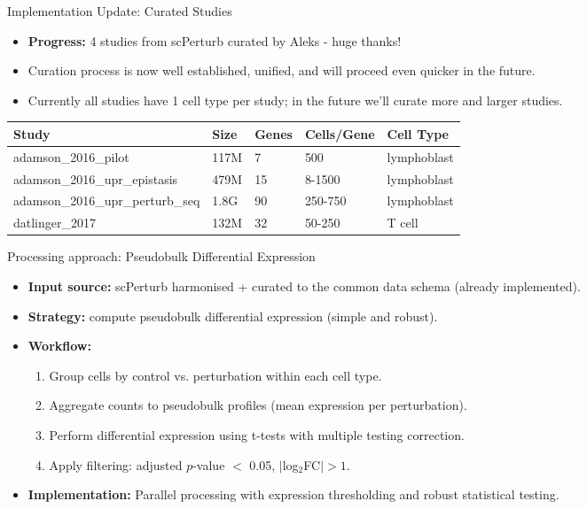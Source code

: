 \documentclass[handout]{beamer}
\begin{document}
\begin{frame}{Implementation Update: Curated Studies}
    \begin{itemize}
        \item \textbf{Progress:} 4 studies from scPerturb curated by Aleks - huge thanks!
        \item Curation process is now well established, unified, and will proceed even quicker in the future.
        \item Currently all studies have 1 cell type per study; in the future we'll curate more and larger studies.
    \end{itemize}
    
    \vspace{0.5em}
    \fontsize{8}{9}\selectfont
    \begin{tabular}{@{}p{4.0cm}p{1cm}p{1.0cm}p{1.5cm}p{1.5cm}@{}}
        \toprule
        \textbf{Study} & \textbf{Size} & \textbf{Genes} & \textbf{Cells/Gene} & \textbf{Cell Type} \\
        \midrule
        adamson\_2016\_pilot & 117M & 7 & 500 & lymphoblast \\
        adamson\_2016\_upr\_epistasis & 479M & 15 & 8-1500 & lymphoblast \\
        adamson\_2016\_upr\_perturb\_seq & 1.8G & 90 & 250-750 & lymphoblast \\
        datlinger\_2017 & 132M & 32 & 50-250 & T cell \\
        \bottomrule
    \end{tabular}
\end{frame}

\begin{frame}{Processing approach: Pseudobulk Differential Expression}
    \begin{itemize}
        \item \textbf{Input source:} scPerturb harmonised + curated to the common data schema (already implemented).
        \item \textbf{Strategy:} compute pseudobulk differential expression (simple and robust).
        \item \textbf{Workflow:}
        \begin{enumerate}
            \item Group cells by control vs. perturbation within each cell type.
            \item Aggregate counts to pseudobulk profiles (mean expression per perturbation).
            \item Perform differential expression using t-tests with multiple testing correction.
            \item Apply filtering: adjusted $p$-value $<$ 0.05, $\lvert$log$_2$FC$\rvert > 1$.
        \end{enumerate}
        \item \textbf{Implementation:} Parallel processing with expression thresholding and robust statistical testing.
    \end{itemize}
\end{frame}
\end{document}
